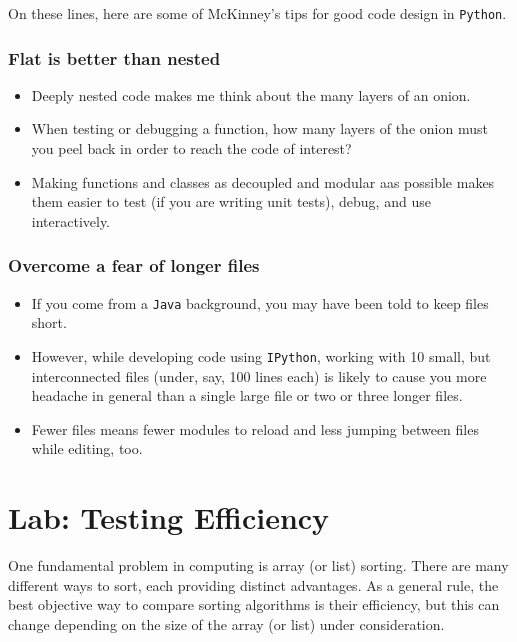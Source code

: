 \documentclass{article}
\begin{document}
On these lines, here are some of McKinney's tips for good code design in
\texttt{Python}.

\subsubsection{Flat is better than
nested}\label{flat-is-better-than-nested}

\begin{itemize}
\itemsep1pt\parskip0pt
\item
  Deeply nested code makes me think about the many layers of an onion.
\item
  When testing or debugging a function, how many layers of the onion
  must you peel back in order to reach the code of interest?
\item
  Making functions and classes as decoupled and modular aas possible
  makes them easier to test (if you are writing unit tests), debug, and
  use interactively.
\end{itemize}

\subsubsection{Overcome a fear of longer
files}\label{overcome-a-fear-of-longer-files}

\begin{itemize}
\itemsep1pt\parskip0pt
\item
  If you come from a \texttt{Java} background, you may have been told to
  keep files short.
\item
  However, while developing code using \texttt{IPython}, working with 10
  small, but interconnected files (under, say, 100 lines each) is likely
  to cause you more headache in general than a single large file or two
  or three longer files.
\item
  Fewer files means fewer modules to reload and less jumping between
  files while editing, too.
\end{itemize}

    \section{Lab: Testing Efficiency}\label{lab-testing-efficiency}

One fundamental problem in computing is array (or list) sorting. There
are many different ways to sort, each providing distinct advantages. As
a general rule, the best objective way to compare sorting algorithms is
their efficiency, but this can change depending on the size of the array
(or list) under consideration.
\end{document}

